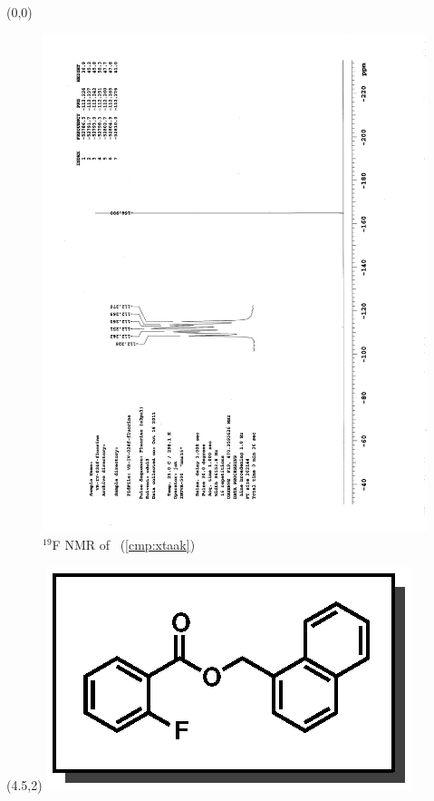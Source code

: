 \clearpage
\begin{textblock}{20}(0,0)
\begin{figure}[htb]
\caption{$^{19}$F NMR of  \CMPxtaak\ (\ref{cmp:xtaak})}
\includegraphics[scale=0.75, trim = 0mm 0mm 0mm 5mm,
clip]{chp_asymmetric/images/nmr/xtaakF}
\vspace{-100pt}
\end{figure}
\end{textblock}
\begin{textblock}{1}(4.5,2)
\includegraphics[scale=0.8, angle=90]{chp_asymmetric/images/xtaak}
\end{textblock}
\clearpage

